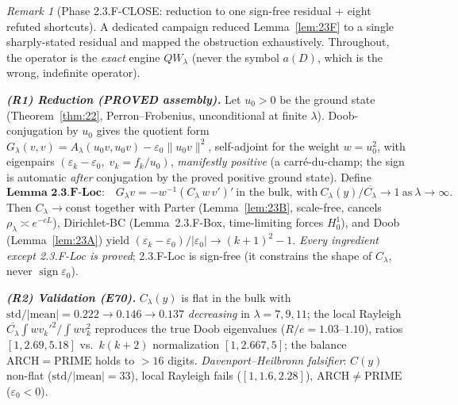 \documentclass[11pt]{amsart}
\theoremstyle{definition}
\theoremstyle{remark}
\newtheorem{remark}[theorem]{Remark}
\newcommand{\ve}{\varepsilon}
\begin{document}
\begin{remark}[Phase 2.3.F-CLOSE: reduction to one sign-free residual + eight refuted shortcuts]\label{rem:23Fclose}
A dedicated campaign reduced Lemma~\ref{lem:23F} to a single sharply-stated residual and mapped the obstruction exhaustively. Throughout, the operator is the \emph{exact} engine $QW_\lambda$ (never the symbol $a(D)$, which is the wrong, indefinite operator).

\emph{\textbf{(R1) Reduction (PROVED assembly).}} Let $u_0>0$ be the ground state (Theorem~\ref{thm:22}, Perron--Frobenius, unconditional at finite $\lambda$). Doob-conjugation by $u_0$ gives the quotient form $G_\lambda(v,v)=A_\lambda(u_0v,u_0v)-\ve_0\|u_0v\|^2$, self-adjoint for the weight $w=u_0^2$, with eigenpairs $(\ve_k-\ve_0,\;v_k=f_k/u_0)$, \emph{manifestly positive} (a carr\'e-du-champ; the sign is automatic \emph{after} conjugation by the proved positive ground state). Define
\[\textbf{Lemma 2.3.F-Loc:}\quad G_\lambda v=-w^{-1}(C_\lambda\,w\,v')'\ \text{in the bulk, with}\ C_\lambda(y)/\overline{C_\lambda}\to1\ \text{as}\ \lambda\to\infty.\]
Then $C_\lambda\to\mathrm{const}$ together with Parter (Lemma~\ref{lem:23B}, scale-free, cancels $\rho_\lambda\asymp e^{-cL}$), Dirichlet-BC (Lemma~2.3.F-Box, time-limiting forces $H^1_0$), and Doob (Lemma~\ref{lem:23A}) yield $(\ve_k-\ve_0)/|\ve_0|\to(k+1)^2-1$. \emph{Every ingredient except 2.3.F-Loc is proved}; 2.3.F-Loc is sign-free (it constrains the shape of $C_\lambda$, never $\operatorname{sign}\ve_0$).

\emph{\textbf{(R2) Validation (E70).}} $C_\lambda(y)$ is flat in the bulk with $\mathrm{std}/|\mathrm{mean}|=0.222\to0.146\to0.137$ \emph{decreasing} in $\lambda=7,9,11$; the local Rayleigh $\overline{C_\lambda}\int w v_k'^2/\int w v_k^2$ reproduces the true Doob eigenvalues ($R/e=1.03$--$1.10$), ratios $[1,2.69,5.18]$ vs.\ $k(k+2)$ normalization $[1,2.667,5]$; the balance $\mathrm{ARCH}=\mathrm{PRIME}$ holds to $>16$ digits. \emph{Davenport--Heilbronn falsifier}: $C(y)$ non-flat ($\mathrm{std}/|\mathrm{mean}|=33$), local Rayleigh fails ($[1,1.6,2.28]$), $\mathrm{ARCH}\ne\mathrm{PRIME}$ ($\ve_0<0$).


\end{remark}
\end{document}
